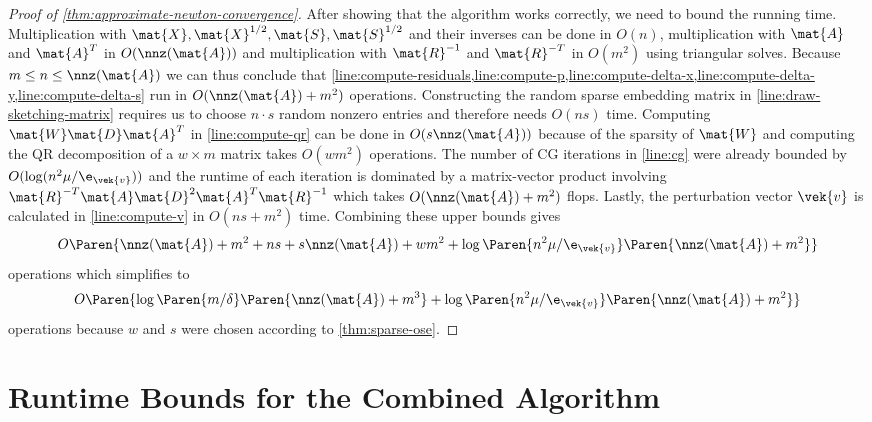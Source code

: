 \begin{proof}[Proof of \cref{thm:approximate-newton-convergence}]
  After showing that the algorithm works correctly, we need to bound the running time.
  Multiplication with \(\mat{X}, \mat{X}^{1/2}, \mat{S}, \mat{S}^{1/2}\) and their inverses can be done in \(O(n)\), multiplication with \(\mat{A}\) and \(\mat{A}^T\) in \(O(\nnz(\mat{A}))\) and multiplication with \(\mat{R}^{-1}\) and \(\mat{R}^{-T}\) in \(O(m^2)\) using triangular solves.
  Because \(m \leq n \leq \nnz(\mat{A})\) we can thus conclude that \cref{line:compute-residuals,line:compute-p,line:compute-delta-x,line:compute-delta-y,line:compute-delta-s} run in \(O(\nnz(\mat{A}) + m^2)\) operations.
  Constructing the random sparse embedding matrix in \cref{line:draw-sketching-matrix} requires us to choose \(n \cdot s\) random nonzero entries and therefore needs \(O(n s)\) time.
  Computing \(\mat{W}\mat{D}\mat{A}^T\) in \cref{line:compute-qr} can be done in \(O(s \nnz(\mat{A}))\) because of the sparsity of \(\mat{W}\) and computing the QR decomposition of a \(w \times m\) matrix takes \(O(w m^2)\) operations.
  The number of CG iterations in \cref{line:cg} were already bounded by \(O(\log(n^2 \mu / \e_{\vek{v}}))\) and the runtime of each iteration is dominated by a matrix-vector product involving \(\mat{R}^{-T}\mat{A}\mat{D}^2\mat{A}^T\mat{R}^{-1}\) which takes \(O(\nnz(\mat{A}) + m^2)\) flops.
  Lastly, the perturbation vector \(\vek{v}\) is calculated in \cref{line:compute-v} in \(O(ns + m^2)\) time.
  Combining these upper bounds gives
  \[ O \Paren{\nnz(\mat{A}) + m^2 + ns + s \nnz(\mat{A}) + wm^2 + \log \Paren{n^2 \mu / \e_{\vek{v}}} \Paren{\nnz(\mat{A}) + m^2}} \]
  operations which simplifies to
  \[ O \Paren{\log \Paren{m/\delta} \Paren{\nnz(\mat{A}) + m^3} + \log \Paren{n^2 \mu / \e_{\vek{v}}} \Paren{\nnz(\mat{A}) + m^2}} \]
  operations because \(w\) and \(s\) were chosen according to \cref{thm:sparse-ose}.
\end{proof}


\section{Runtime Bounds for the Combined Algorithm}

